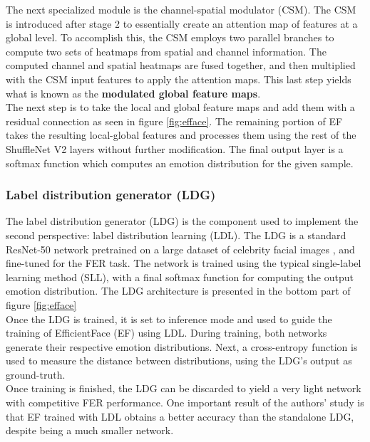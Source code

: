 \documentclass[../main.tex]{subfiles}
\begin{document}
The next specialized module is the channel-spatial modulator (CSM).
The CSM is introduced after stage 2 to essentially create an attention map of features at a global level.
To accomplish this, the CSM employs two parallel branches to compute two sets of heatmaps from spatial and channel information.
The computed channel and spatial heatmaps are fused together, and then multiplied with the CSM input features to apply the attention maps.
This last step yields what is known as the \textbf{modulated global feature maps}.\\

The next step is to take the local and global feature maps and add them with a residual connection as seen in figure \ref{fig:efface}.
The remaining portion of EF takes the resulting local-global features and processes them using the rest of the ShuffleNet V2 layers without further modification.
The final output layer is a softmax function which computes an emotion distribution for the given sample.\\

\subsubsection{Label distribution generator (LDG)}

The label distribution generator (LDG) is the component used to implement the second perspective: label distribution learning (LDL).
The LDG is a standard ResNet-50 \cite{he2016resnet} network pretrained on a large dataset of celebrity facial images \cite{guo2016msceleb}, and fine-tuned for the FER task.
The network is trained using the typical single-label learning method (SLL), with a final softmax function for computing the output emotion distribution.
The LDG architecture is presented in the bottom part of figure \ref{fig:efface} \\

Once the LDG is trained, it is set to inference mode and used to guide the training of EfficientFace (EF) using LDL.
During training, both networks generate their respective emotion distributions.
Next, a cross-entropy function is used to measure the distance between distributions, using the LDG's output as ground-truth.\\

Once training is finished, the LDG can be discarded to yield a very light network with competitive FER performance.
One important result of the authors' study is that EF trained with LDL obtains a better accuracy than the standalone LDG, despite being a much smaller network.
\end{document}
